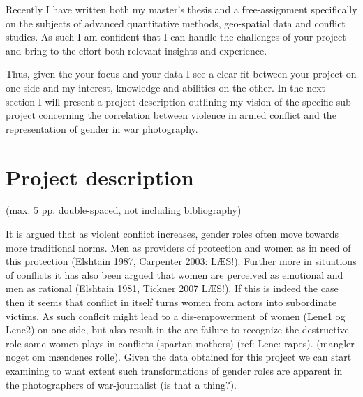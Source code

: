 \documentclass[a4paper]{article}
\begin{document}
Recently I have written both my master's thesis \citep{SPECIALE} and a free-assignment \citep{Maase} specifically on the subjects of advanced quantitative methods, geo-spatial data and conflict studies. As such I am confident that I can handle the challenges of your project and bring to the effort both relevant insights and experience.\par%

Thus, given the your focus and your data I see a clear fit between your project on one side and my interest, knowledge and abilities on the other. In the next section I will present a project description outlining my vision of the specific sub-project concerning the correlation between violence in armed conflict and the representation of gender in war photography.\par


\section{Project description} 
(max. 5 pp. double-spaced, not including bibliography) 

It is argued that as violent conflict increases, gender roles often move towards more traditional norms. Men as providers of protection and women as in need of this protection (Elshtain 1987, Carpenter 2003: LÆS!). Further more in situations of conflicts it has also been argued that women are perceived as emotional and men as rational (Elshtain 1981, Tickner 2007 LÆS!). If this is indeed the case then it seems that conflict in itself turns women from actors into subordinate victims. As such conflcit might lead to a dis-empowerment of women (Lene1 og Lene2) on one side, but also result in the are failure to recognize the destructive role some women plays in conflicts (spartan mothers) (ref: Lene: rapes). (mangler noget om mændenes rolle). Given the data obtained for this project we can start examining to what extent such transformations of gender roles are apparent in the photographers of war-journalist (is that a thing?).\par

\end{document}
